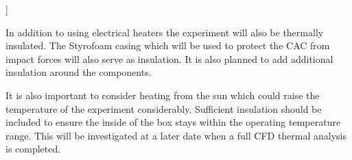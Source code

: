 ]\documentclass[a4paper,12pt,twoside]{article}
\begin{document}
\begin{centering}
In addition to using electrical heaters the experiment will also be thermally insulated. The Styrofoam casing which will be used to protect the CAC from impact forces will also serve as insulation. It is also planned to add additional insulation around the components.  
\end{centering}

\begin{centering}
It is also important to consider heating from the sun which could raise the temperature of the experiment considerably. Sufficient insulation should be included to ensure the inside of the box stays within the operating temperature range. This will be investigated at a later date when a full CFD thermal analysis is completed.
\end{centering}
\bigskip

\pagebreak
\end{document}
